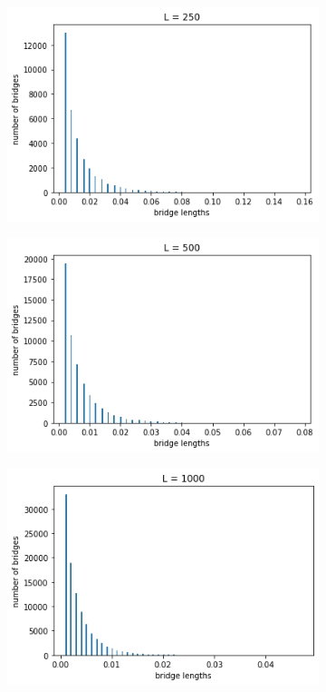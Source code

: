 \begin{figure}[H]
	\centering
	\begin{subfigure}[t]{0.3\textwidth} 
		\includegraphics[width=\textwidth]{../images/bridge_lengths_L250.png} 
	\end{subfigure}
	\begin{subfigure}[t]{0.3\textwidth} 
		\includegraphics[width=\textwidth]{../images/bridge_lengths_L500.png} 
	\end{subfigure}
	\begin{subfigure}[t]{0.3\textwidth} 
		\includegraphics[width=\textwidth]{../images/bridge_lengths_L1000.png} 

\end{subfigure}
\end{figure}
